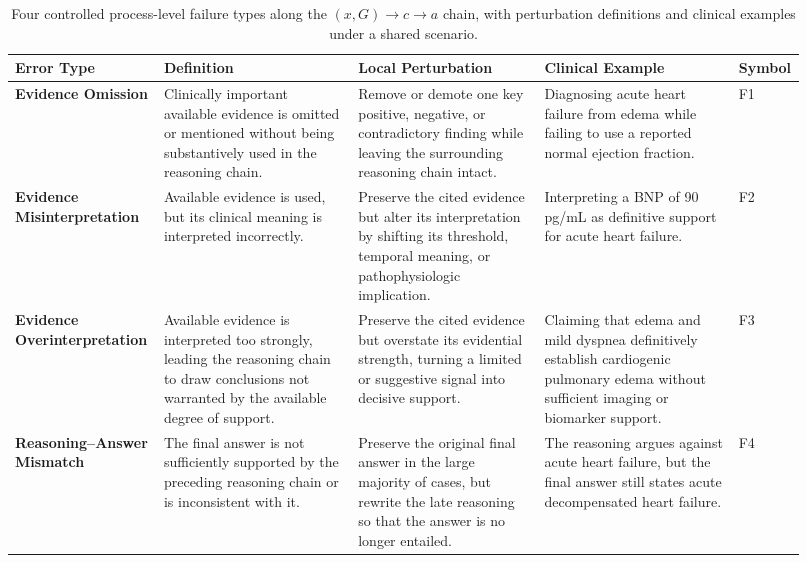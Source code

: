 \documentclass[a4paper,fleqn,doubleblind]{cas-sc}
\begin{document}
\begin{table}[htbp]
    \centering
    \scriptsize
    \setlength{\tabcolsep}{4pt}
    \renewcommand{\arraystretch}{1.5}
    \caption{Four controlled process-level failure types along the $(x,G)\!\to\!c\!\to\!a$ chain, with perturbation definitions and clinical examples under a shared scenario.}
    \begin{tabular}{
        >{\raggedright\arraybackslash}p{0.15\linewidth}
        >{\raggedright\arraybackslash}p{0.24\linewidth}
        >{\raggedright\arraybackslash}p{0.23\linewidth}
        >{\raggedright\arraybackslash}p{0.24\linewidth}
        >{\centering\arraybackslash}p{0.06\linewidth}
    }
        \toprule
        \textbf{Error Type} & \textbf{Definition} & \textbf{Local Perturbation} & \textbf{Clinical Example} & \textbf{Symbol} \\
        \midrule

        \textbf{Evidence Omission} &
        Clinically important available evidence is omitted or mentioned without being substantively used in the reasoning chain. &
        Remove or demote one key positive, negative, or contradictory finding while leaving the surrounding reasoning chain intact. &
        Diagnosing acute heart failure from edema while failing to use a reported normal ejection fraction. &
        F1 \\

        \textbf{Evidence Misinterpretation} &
        Available evidence is used, but its clinical meaning is interpreted incorrectly. &
        Preserve the cited evidence but alter its interpretation by shifting its threshold, temporal meaning, or pathophysiologic implication. &
        Interpreting a BNP of 90 pg/mL as definitive support for acute heart failure. &
        F2 \\

        \textbf{Evidence Overinterpretation} &
        Available evidence is interpreted too strongly, leading the reasoning chain to draw conclusions not warranted by the available degree of support. &
        Preserve the cited evidence but overstate its evidential strength, turning a limited or suggestive signal into decisive support. &
        Claiming that edema and mild dyspnea definitively establish cardiogenic pulmonary edema without sufficient imaging or biomarker support. &
        F3 \\

        \textbf{Reasoning--Answer Mismatch} &
        The final answer is not sufficiently supported by the preceding reasoning chain or is inconsistent with it. &
        Preserve the original final answer in the large majority of cases, but rewrite the late reasoning so that the answer is no longer entailed. &
        The reasoning argues against acute heart failure, but the final answer still states acute decompensated heart failure. &
        F4 \\
        \bottomrule
    \end{tabular}
    \label{tab:error_types}
\end{table}
\end{document}
